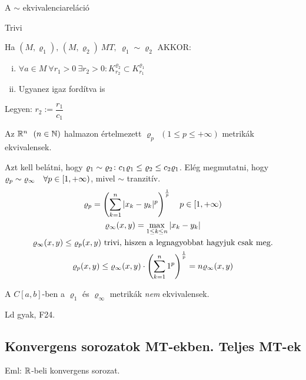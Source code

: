 \begin{te}
  A $\sim$ ekvivalenciareláció
\end{te}
\begin{biz}
  Trivi
\end{biz}

\begin{te}
  Ha $(M, \varrho_1),\,(M, \varrho_2)\ MT,\ \varrho_1\sim\varrho_2$
  AKKOR:  \begin{enumerate}[i)]
  \item $\forall a \in M\  \forall r_1>0\  \exists r_2>0\colon
    K_{r_2}^{\varrho_2}\subset K_{r_1}^{\varrho_1}$
  \item Ugyanez igaz fordítva is
  \end{enumerate}
\end{te}
\begin{biz}
  Legyen: $r_2:=\dfrac{r_1}{c_1}$
\end{biz}

\begin{te}
  Az $\mathbb{R}^n\ \ (n\in\mathbb{N})$ halmazon értelmezett $\varrho_p\ \ (1\leq
  p\leq+\infty)$ metrikák ekvivalensek.
\end{te}
\begin{biz}
  Azt kell belátni, hogy $\varrho_1\sim\varrho_2\colon c_1\varrho_1\leq\varrho_2\leq c_2\varrho_1$.
  Elég megmutatni, hogy $\varrho_p\sim\varrho_\infty\quad\forall p\in[1,+\infty)$, mivel $\sim$ tranzitív.
    \begin{gather*}
      \varrho_p=\left(\sum_{k=1}^n\vert x_k-y_k\vert^p\right)^{\frac1p}\quad p\in[1,+\infty)\\
	\varrho_\infty(x,y)=\max_{1\leq k\leq n}\vert x_k-y_k\vert\\
	\varrho_\infty(x,y)\leq\varrho_p(x,y)\text{ trivi, hiszen a legnagyobbat hagyjuk csak meg.}\\
	\varrho_p(x,y)\leq\varrho_\infty(x,y)\cdot\left(\sum_{k=1}^n1^p\right)^{\frac1p}=n\varrho_\infty(x,y)
    \end{gather*}
\end{biz}

\begin{te}
  A $C[a,b]$-ben a $\varrho_1$ és $\varrho_\infty$ metrikák
  \emph{nem} ekvivalensek.   
\end{te}

\begin{biz}
  Ld gyak, F24.
\end{biz}

\subsection{Konvergens sorozatok MT-ekben. Teljes MT-ek}
Eml:  $\mathbb{R}$-beli konvergens sorozat.

